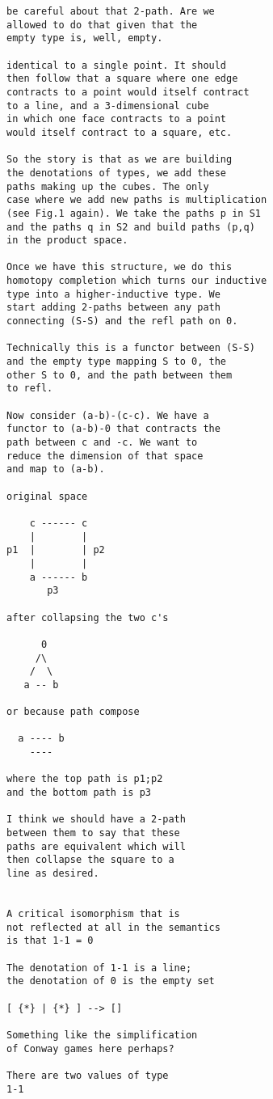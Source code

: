 \documentclass[authoryear,preprint]{sigplanconf}
\begin{document}
\begin{verbatim}
be careful about that 2-path. Are we 
allowed to do that given that the 
empty type is, well, empty.

identical to a single point. It should 
then follow that a square where one edge 
contracts to a point would itself contract 
to a line, and a 3-dimensional cube 
in which one face contracts to a point 
would itself contract to a square, etc. 

So the story is that as we are building
the denotations of types, we add these
paths making up the cubes. The only
case where we add new paths is multiplication
(see Fig.1 again). We take the paths p in S1
and the paths q in S2 and build paths (p,q)
in the product space.

Once we have this structure, we do this 
homotopy completion which turns our inductive
type into a higher-inductive type. We 
start adding 2-paths between any path 
connecting (S-S) and the refl path on 0.

Technically this is a functor between (S-S) 
and the empty type mapping S to 0, the 
other S to 0, and the path between them
to refl. 

Now consider (a-b)-(c-c). We have a 
functor to (a-b)-0 that contracts the
path between c and -c. We want to 
reduce the dimension of that space
and map to (a-b). 

original space

    c ------ c
    |        |  
p1  |        | p2
    |        |  
    a ------ b
       p3

after collapsing the two c's

      0
     /\
    /  \
   a -- b

or because path compose

  a ---- b
    ---- 

where the top path is p1;p2
and the bottom path is p3

I think we should have a 2-path
between them to say that these
paths are equivalent which will 
then collapse the square to a 
line as desired.


A critical isomorphism that is 
not reflected at all in the semantics
is that 1-1 = 0 

The denotation of 1-1 is a line;
the denotation of 0 is the empty set

[ {*} | {*} ] --> []

Something like the simplification
of Conway games here perhaps?

There are two values of type
1-1


\end{verbatim}
\end{document}
